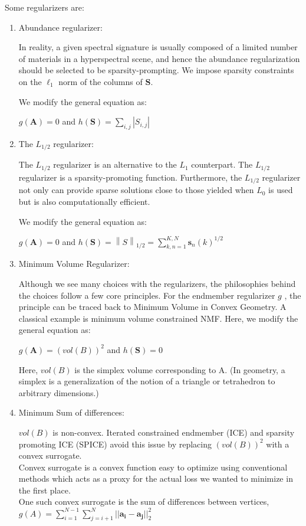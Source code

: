 \documentclass[fleqn, 11pt]{article}
\newcommand{\bs}[1]{\boldsymbol{#1}}
\newcommand\norm[1]{\left\lVert#1\right\rVert}
\begin{document}
\newpage

Some regularizers are: 

\begin{enumerate}
\item Abundance regularizer:
    
In reality, a given spectral signature is usually composed of a limited number of materials in a hyperspectral scene, and hence the abundance regularization should be selected to be sparsity-prompting. We impose sparsity constraints on the $\ell_1$ norm of the columns of $\bs{S}$. 

We modify the general equation as: 

$g(\bs{A})=0$ and $h(\bs{S}) = \displaystyle \sum_{i,j} | S_{i,j} | $

\item The $L_{1/2}$ regularizer: 

The $L_{1/2}$ regularizer is an alternative to the $L_{1}$ counterpart. The $L_{1/2}$ regularizer is a sparsity-promoting function. Furthermore, the $L_{1/2}$ regularizer not only can provide sparse solutions close to those yielded when $L_{0}$ is used but is also computationally efficient.

We modify the general equation as: 

$g(\bs{A})=0$ and $h(\bs{S}) = \norm{S}_{1/2} = \displaystyle \sum_{k,n=1}^{K,N} \bs{s}_n(k)^{1/2}$

\item Minimum Volume Regularizer: 

Although we see many choices with the regularizers, the philosophies behind the choices follow a few core principles. For the endmember regularizer $g$ , the principle can be traced back to Minimum Volume in Convex Geometry. A classical example is minimum volume constrained NMF. Here, we modify the general equation as: 

$g(\bs{A})= (vol(B))^2$ and $h(\bs{S}) = 0$

Here, $vol(B)$ is the simplex volume corresponding to A. (In geometry, a simplex is a generalization of the notion of a triangle or tetrahedron to arbitrary dimensions.)

\item Minimum Sum of differences:

$vol(B)$ is non-convex. Iterated constrained endmember (ICE) and sparsity promoting ICE (SPICE) avoid this issue by replacing $(vol(B))^2$ with a convex surrogate. \\
Convex surrogate is a convex function easy to optimize using conventional methods which acts as a proxy for the actual loss we wanted to minimize in the first place. \\
One such convex surrogate is the sum of differences between vertices, $g(A) = \sum_{i=1}^{N-1} \sum_{j=i+1}^{N} || \bs{a_i} - \bs{a_j} ||_2^2$

\end{enumerate}
\end{document}
